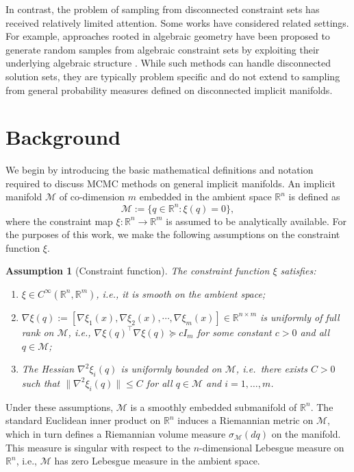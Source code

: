 \documentclass[12pt]{article}
\newtheorem{assumption}{Assumption}[section]
\begin{document}
In contrast, the problem of sampling from disconnected constraint sets has received relatively limited attention. Some works have considered related settings. For example, approaches rooted in algebraic geometry have been proposed to generate random samples from algebraic constraint sets by exploiting their underlying algebraic structure \citep{RPAM}. While such methods can handle disconnected solution sets, they are typically problem specific and do not extend to sampling from general probability measures defined on disconnected implicit manifolds.

\section{Background}\label{sec3}
We begin by introducing the basic mathematical definitions and notation required to discuss MCMC methods on general implicit manifolds. An implicit manifold $\mathcal{M}$ of co-dimension $m$ embedded in the ambient space $\mathbb{R}^n$ is defined as
\[
\mathcal{M} := \{ q \in \mathbb{R}^n : \xi(q) = 0 \},
\]
where the constraint map $\xi : \mathbb{R}^n \to \mathbb{R}^m$ is assumed to be analytically available. For the purposes of this work, we make the following assumptions on the constraint function $\xi$.
\begin{assumption}[Constraint function]\label{ass:xi}
The constraint function $\xi$ satisfies:
\begin{enumerate}
    \item[(i)] $\xi \in C^\infty(\mathbb{R}^n, \mathbb R^m)$, i.e., it is smooth on the ambient space;
    \item[(ii)] $\nabla \xi(q):=[\nabla\xi_1(x),\nabla\xi_2(x),\cdots,\nabla\xi_m(x)]\in\mathbb R^{n\times m}$ is uniformly of full rank on $\mathcal{M}$, i.e., $\nabla \xi(q)^\top \nabla \xi(q) \succeq c I_m$ for some constant $c > 0$ and all $q \in \mathcal{M}$;
    \item[(iii)] The Hessian $\nabla^2 \xi_i(q)$ is uniformly bounded on 
    $\mathcal{M}$, i.e.\ there exists $C > 0$ such that 
    $\|\nabla^2 \xi_i(q)\| \le C$ for all $q \in \mathcal{M}$ and 
    $i = 1,\ldots,m$.
\end{enumerate}
\end{assumption}
Under these assumptions, $\mathcal{M}$ is a smoothly embedded submanifold of $\mathbb{R}^n$.
The standard Euclidean inner product on $\mathbb{R}^n$ induces a Riemannian metric on $\mathcal{M}$, which in turn defines a Riemannian volume measure $\sigma_{\mathcal{M}}(dq)$ on the manifold. This measure is singular with respect to the $n$-dimensional Lebesgue measure on $\mathbb{R}^n$, i.e., $\mathcal{M}$ has zero Lebesgue measure in the ambient space.
\end{document}

